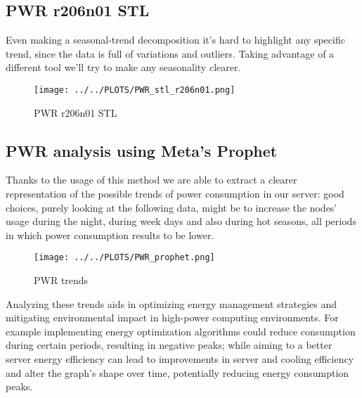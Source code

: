 \subsection{PWR r206n01 STL}
Even making a seasonal-trend decomposition it’s hard to highlight any specific trend, since the data is full of variations and outliers. Taking advantage of a different tool we’ll try to make any seasonality clearer.

\vspace{-10pt}

\begin{figure}[H]
\centering
\texttt{[image: ../../PLOTS/PWR\_stl\_r206n01.png]}
\caption{PWR r206n01 STL}
\label{fig:PWR_stl_r206n01}
\end{figure}

\subsection{PWR analysis using Meta's Prophet}
Thanks to the usage of this method we are able to extract a clearer representation of the possible trends of power consumption in our server:
good choices, purely looking at the following data, might be to increase the nodes' usage during the night, during week days and also during hot seasons, all periods in which power consumption results to be lower. 

\vspace{-10pt}

\begin{figure}[H]
\centering
\texttt{[image: ../../PLOTS/PWR\_prophet.png]}
\caption{PWR trends}
\label{fig:PWR_prophet}
\end{figure}

\noindent
Analyzing these trends aids in optimizing energy management strategies and mitigating environmental impact in high-power computing environments.
For example implementing energy optimization algorithms could reduce consumption during certain periods, resulting in negative peaks;
while aiming to a better server energy efficiency can lead to improvements in server and cooling efficiency and alter the graph's shape over time, potentially reducing energy consumption peaks.
